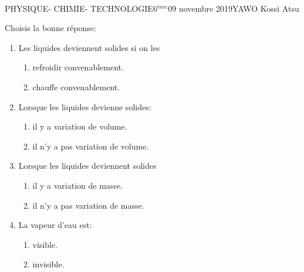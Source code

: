 \documentclass[12pt,a4paper]{book}
\newcommand{\prof}{YAWO Kossi Atsu}
\newcommand{\matiere}{\\PHYSIQUE- CHIMIE- TECHNOLOGIE}
\newcommand{\classe}{6$^{ème}$}
\begin{document}
\begin{td}{\matiere}{\classe}{09 novembre 2019}{\prof}
\begin{exo}
Choisis la bonne réponse:
\begin{multicols}{2}
\begin{enumerate}
\item Les liquides deviennent solides si on les
\begin{enumerate}
\item refroidir convenablement.
\item chauffe convenablement.
\end{enumerate}

\item Lorsque les liquides devienne solides:
\begin{enumerate}
\item il y a variation de volume.
\item il n'y a pas variation de volume.
\end{enumerate}

\item Lorsque les liquides deviennent solides
\begin{enumerate}
\item il y a variation de masse.
\item il n'y a pas variation de masse.
\end{enumerate}

\item La vapeur d'eau est:
\begin{enumerate}
\item visible.
\item invisible.
\end{enumerate}
\end{enumerate}

\end{multicols}
\end{exo}


\end{td}
\end{document}

